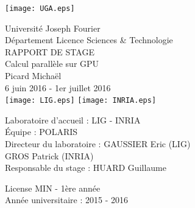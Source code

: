 \documentclass[a4paper,12pt]{article}
\begin{document}
	\begin{flushright}
		\texttt{[image: UGA.eps]}
	\end{flushright}
	\vspace{1.5cm}
	\begin{center}
		{\Large Universit\'e{} Joseph Fourier\\
		D\'e{}partement Licence Sciences \& Technologie}\\
		\vspace{1cm}
		{\Huge RAPPORT DE STAGE}\\
		\vspace{3mm}
		{\Large Calcul parall\`ele sur GPU}\\
		\vspace{2mm}
		Picard Micha\"el\\
		6 juin 2016 - 1er juillet 2016\\
		\vspace{4mm}
		\texttt{[image: LIG.eps]}
		\texttt{[image: INRIA.eps]}
	\end{center}
	\vspace{1cm}
	\begin{flushleft}
		Laboratoire d'accueil : LIG - INRIA\\
		\'E{}quipe : POLARIS\\
		Directeur du laboratoire : GAUSSIER Eric (LIG)\\
		\hspace{4.65cm} GROS Patrick (INRIA)\\
		Responsable du stage : HUARD Guillaume
	\end{flushleft}
	\vspace{8mm}
	\begin{flushright}
	License MIN - 1\`ere ann\'e{}e\\
	Ann\'e{}e universitaire : 2015 - 2016
	\end{flushright}
	
\end{document}
